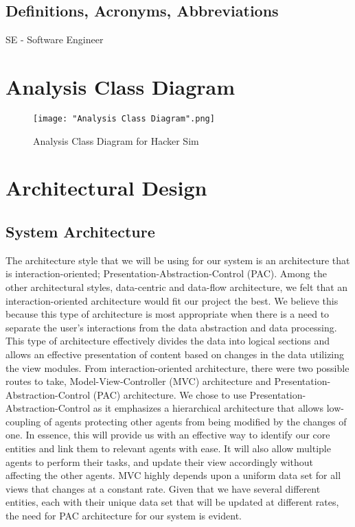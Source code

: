 \documentclass[]{article}
\begin{document}
\subsection{Definitions, Acronyms, Abbreviations}
\label{sub:definitions_acronyms_abbreviations}
SE - Software Engineer

\section{Analysis Class Diagram}
\label{sec:analysis_class_diagram}
\begin{figure}[H]
    \centering
    \texttt{[image: "Analysis Class Diagram".png]}
    \caption{Analysis Class Diagram for Hacker Sim}
\end{figure}


\section{Architectural Design}
\label{sec:architectural_design}

\subsection{System Architecture}
\label{sub:system_architecture}
The architecture style that we will be using for our system is an architecture 
that is interaction-oriented; Presentation-Abstraction-Control (PAC). Among the 
other architectural styles, data-centric and data-flow architecture, we felt 
that an interaction-oriented architecture would fit our project the best. We 
believe this because this type of architecture is most appropriate when there 
is a need to separate the user’s interactions from the data abstraction and 
data processing. This type of architecture effectively divides the data into 
logical sections and allows an effective presentation of content based on 
changes in the data utilizing the view modules. From interaction-oriented 
architecture, there were two possible routes to take, Model-View-Controller 
(MVC) architecture and Presentation-Abstraction-Control (PAC) architecture. We 
chose to use Presentation-Abstraction-Control as it emphasizes a hierarchical 
architecture that allows low-coupling of agents protecting other agents from 
being modified by the changes of one. In essence, this will provide us with an 
effective way to identify our core entities and link them to relevant agents 
with ease. It will also allow multiple agents to perform their tasks, and update 
their view accordingly without affecting the other agents. MVC highly depends 
upon a uniform data set for all views that changes at a constant rate. Given that 
we have several different entities, each with their unique data set that will 
be updated at different rates, the need for PAC architecture for our system is 
evident.
\end{document}
